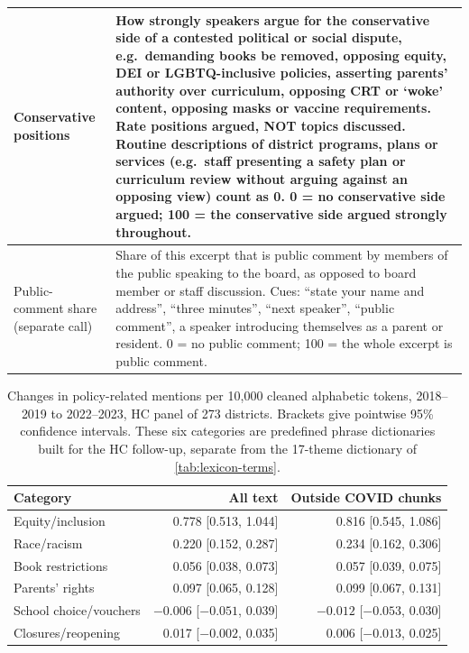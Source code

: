 \begin{table}[H]
\begin{tabularx}{\linewidth}{@{}p{2.9cm}X@{}}
Conservative positions & How strongly speakers argue for the conservative side of a contested political or social dispute, e.g.\ demanding books be removed, opposing equity, DEI or LGBTQ-inclusive policies, asserting parents' authority over curriculum, opposing CRT or `woke' content, opposing masks or vaccine requirements. Rate positions argued, NOT topics discussed. Routine descriptions of district programs, plans or services (e.g.\ staff presenting a safety plan or curriculum review without arguing against an opposing view) count as 0. 0 = no conservative side argued; 100 = the conservative side argued strongly throughout. \\
\midrule
Public-comment share (separate call) & Share of this excerpt that is public comment by members of the public speaking to the board, as opposed to board member or staff discussion. Cues: ``state your name and address'', ``three minutes'', ``next speaker'', ``public comment'', a speaker introducing themselves as a parent or resident. 0 = no public comment; 100 = the whole excerpt is public comment. \\
\bottomrule
\end{tabularx}
\end{table}

\begin{table}[H]
\centering
\caption{Changes in policy-related mentions per 10,000 cleaned
alphabetic tokens, 2018--2019 to 2022--2023, HC panel of 273 districts.
Brackets give pointwise 95\% confidence intervals. These six categories are
predefined phrase dictionaries built for the HC follow-up, separate from the
17-theme dictionary of \cref{tab:lexicon-terms}.}
\label{tab:hc-themes}
\small
\begin{tabular}{lrr}
\toprule
Category & All text & Outside COVID chunks \\
\midrule
Equity/inclusion       & 0.778 [0.513, 1.044]          & 0.816 [0.545, 1.086] \\
Race/racism            & 0.220 [0.152, 0.287]          & 0.234 [0.162, 0.306] \\
Book restrictions      & 0.056 [0.038, 0.073]          & 0.057 [0.039, 0.075] \\
Parents' rights        & 0.097 [0.065, 0.128]          & 0.099 [0.067, 0.131] \\
School choice/vouchers & $-0.006$ [$-0.051$, 0.039]    & $-0.012$ [$-0.053$, 0.030] \\
Closures/reopening     & 0.017 [$-0.002$, 0.035]       & 0.006 [$-0.013$, 0.025] \\
\bottomrule
\end{tabular}
\end{table}

